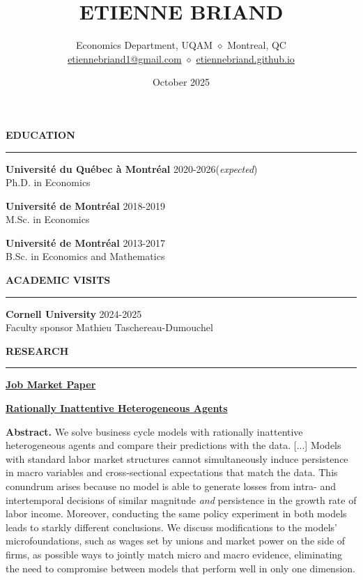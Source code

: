 \documentclass{article}
\title{\huge ETIENNE BRIAND}
\author{Economics Department, UQAM $\diamond$ Montreal, QC \\
              \href{mailto:etiennebriand1@gmail.com}{etiennebriand1@gmail.com} $\diamond$ 
          \href{https://etiennebriand.github.io/}{etiennebriand.github.io}}
\date{October 2025}
\begin{document}
	
	\maketitle
	
   	\noindent\textbf{\large EDUCATION} 
	\vspace{4pt}
	\hrule
	\vspace{6pt} 
	
	\noindent \textbf{Université du Québec à Montréal} \hfill 2020-2026(\textit{expected})\\
	\noindent Ph.D. in Economics
	\vspace{4pt}

	\noindent \textbf{Université de Montréal} \hfill 2018-2019\\
	\noindent M.Sc. in Economics
	\vspace{4pt}

	\noindent \textbf{Université de Montréal} \hfill 2013-2017\\
	\noindent B.Sc. in Economics and Mathematics
	\vspace{6pt} 
   
	\noindent\textbf{\large ACADEMIC VISITS} 
	\vspace{4pt}
	\hrule
	\vspace{6pt} 
	\noindent\textbf{Cornell University}  \hfill 2024-2025\\
	Faculty sponsor Mathieu Taschereau-Dumouchel
	\vspace{6pt}
	
	\noindent\textbf{\large RESEARCH} 
	\vspace{4pt}
	\hrule
	\vspace{6pt} 
	
	\noindent\underline{\textbf{Job Market Paper}}
	\vspace{6pt}
	
	\noindent\href{https://etiennebriand.github.io/riha.pdf}{\textbf{Rationally Inattentive Heterogeneous Agents}}
	\vspace{6pt}
	
	\noindent \textbf{Abstract.} We solve business cycle models with rationally inattentive heterogeneous agents and compare their predictions with the data. [...] Models with standard labor market structures cannot simultaneously induce persistence in macro variables and cross-sectional expectations that match the data. This conundrum arises because no model is able to generate losses from intra- and intertemporal decisions of similar magnitude \textit{and} persistence in the growth rate of labor income. Moreover, conducting the same policy experiment in both models leads to starkly different conclusions. We discuss modifications to the models’ microfoundations, such as wages set by unions and market power on the side of firms, as possible ways to jointly match micro and macro evidence, eliminating the need to compromise between models that perform well in only one dimension.
	\vspace{.5em}
	
\end{document}
